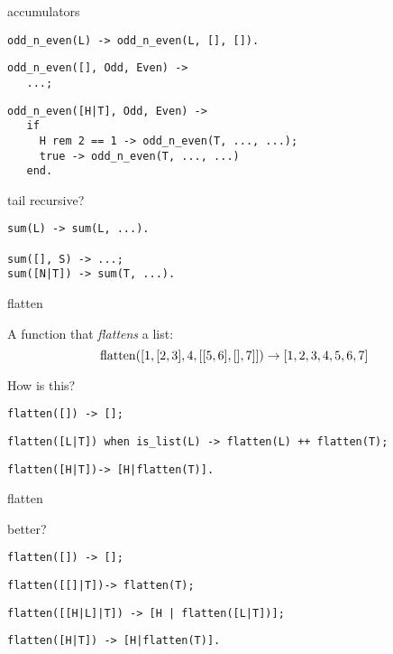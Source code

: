 \begin{frame}[fragile]{accumulators}

\pause
\begin{verbatim}
odd_n_even(L) -> odd_n_even(L, [], []).
\end{verbatim}

\pause
\begin{verbatim}
odd_n_even([], Odd, Even) ->
   ...;
\end{verbatim}
\pause
\begin{verbatim}
odd_n_even([H|T], Odd, Even) -> 
   if 
     H rem 2 == 1 -> odd_n_even(T, ..., ...); 
     true -> odd_n_even(T, ..., ...) 
   end.
\end{verbatim}

\end{frame}

\begin{frame}[fragile]{tail recursive?}

\begin{verbatim}
sum(L) -> sum(L, ...).

sum([], S) -> ...;
sum([N|T]) -> sum(T, ...).
\end{verbatim}

\end{frame}



\begin{frame}[fragile]{flatten}

A function that {\em flattens} a list:  $${\rm flatten}([1,[2,3],4,[[5,6],[],7]]) \rightarrow [1,2,3,4,5,6,7]$$

\pause\vspace{20pt} How is this?

\pause
\begin{verbatim}
flatten([]) -> [];
\end{verbatim}
\pause\begin{verbatim}
flatten([L|T]) when is_list(L) -> flatten(L) ++ flatten(T);
\end{verbatim}
\pause\begin{verbatim}
flatten([H|T])-> [H|flatten(T)].
\end{verbatim}

\end{frame}

\begin{frame}[fragile]{flatten}


\pause\vspace{20pt} better?

\pause
\begin{verbatim}
flatten([]) -> [];
\end{verbatim}
\pause\begin{verbatim}
flatten([[]|T])-> flatten(T);
\end{verbatim}
\pause\begin{verbatim}
flatten([[H|L]|T]) -> [H | flatten([L|T])];
\end{verbatim}
\pause\begin{verbatim}
flatten([H|T]) -> [H|flatten(T)].
\end{verbatim}

\end{frame}



